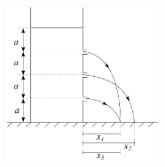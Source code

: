 \begin{problem}
{\begin{enumerate}
\begin{figure}[h]
	\centering
	\includegraphics[width=0.4\textwidth]{../../../figures/Dynamics_Spouting_Can_3.svg}
	\caption{}\label{fig:Dynamics_Spouting_Can_3}
\end{figure}

\end{enumerate}
}
\end{problem}